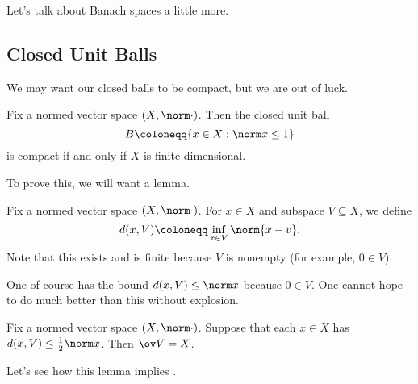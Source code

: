 \documentclass[../notes.tex]{subfiles}
\begin{document}
Let's talk about Banach spaces a little more.

\subsection{Closed Unit Balls}
We may want our closed balls to be compact, but we are out of luck.
\begin{proposition} \label{prop:no-compact-ball}
	Fix a normed vector space $(X,\norm\cdot)$. Then the closed unit ball
	\[B\coloneqq\{x\in X:\norm x\le1\}\]
	is compact if and only if $X$ is finite-dimensional.
\end{proposition}
To prove this, we will want a lemma.
\begin{definition}
	Fix a normed vector space $(X,\norm\cdot)$. For $x\in X$ and subspace $V\subseteq X$, we define
	\[d(x,V)\coloneqq\inf_{x\in V}\norm{x-v}.\]
	Note that this exists and is finite because $V$ is nonempty (for example, $0\in V$).
\end{definition}
One of course has the bound $d(x,V)\le\norm x$ because $0\in V$. One cannot hope to do much better than this without explosion.
\begin{lemma} \label{lem:dense-subspace}
	Fix a normed vector space $(X,\norm\cdot)$. Suppose that each $x\in X$ has $d(x,V)\le\frac12\norm x$. Then $\ov V=X$.
\end{lemma}
Let's see how this lemma implies .
\end{document}
